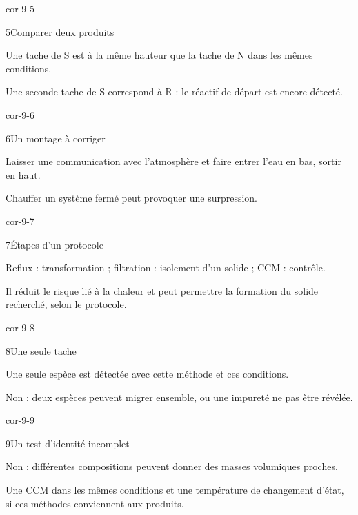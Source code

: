 \begin{blocLivre}{cor-9-5}\begin{corrige}{5}{Comparer deux produits}
\begin{questions}
\item Une tache de S est à la même hauteur que la tache de N dans les mêmes conditions.
\item Une seconde tache de S correspond à R : le réactif de départ est encore détecté.
\end{questions}
\end{corrige}\end{blocLivre}
\begin{blocLivre}{cor-9-6}\begin{corrige}{6}{Un montage à corriger}
\begin{questions}
\item Laisser une communication avec l’atmosphère et faire entrer l’eau en bas, sortir en haut.
\item Chauffer un système fermé peut provoquer une surpression.
\end{questions}
\end{corrige}\end{blocLivre}
\begin{blocLivre}{cor-9-7}\begin{corrige}{7}{Étapes d’un protocole}
\begin{questions}
\item Reflux : transformation ; filtration : isolement d’un solide ; CCM : contrôle.
\item Il réduit le risque lié à la chaleur et peut permettre la formation du solide recherché, selon le protocole.
\end{questions}
\end{corrige}\end{blocLivre}
\begin{blocLivre}{cor-9-8}\begin{corrige}{8}{Une seule tache}
\begin{questions}
\item Une seule espèce est détectée avec cette méthode et ces conditions.
\item Non : deux espèces peuvent migrer ensemble, ou une impureté ne pas être révélée.
\end{questions}
\end{corrige}\end{blocLivre}
\begin{blocLivre}{cor-9-9}\begin{corrige}{9}{Un test d’identité incomplet}
\begin{questions}
\item Non : différentes compositions peuvent donner des masses volumiques proches.
\item Une CCM dans les mêmes conditions et une température de changement d’état, si ces méthodes conviennent aux produits.
\end{questions}
\end{corrige}\end{blocLivre}
